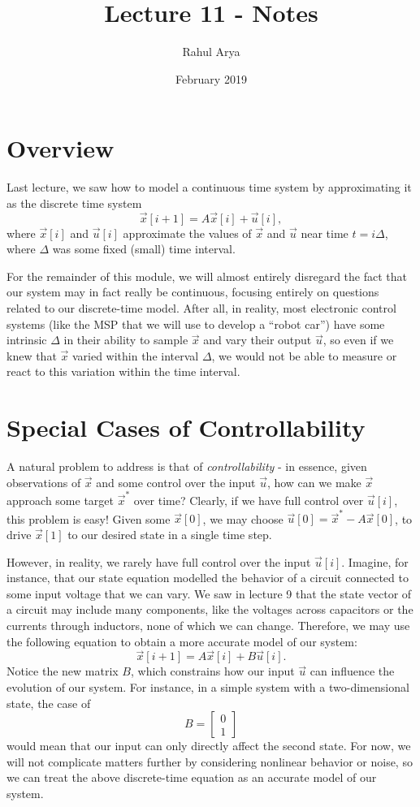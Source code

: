\documentclass[letterpaper]{article}
\title{Lecture 11 - Notes}
\author{Rahul Arya}
\date{February 2019}
\theoremstyle{remark}
\newcommand{\mat}[1]{\ensuremath{\begin{bmatrix}#1\end{bmatrix}}}
\begin{document}
\maketitle

\section{Overview}
Last lecture, we saw how to model a continuous time system by approximating it as the discrete time system
\[
    \vec{x}[i + 1] = A\vec{x}[i] + \vec{u}[i],
\]
where $\vec{x}[i]$ and $\vec{u}[i]$ approximate the values of $\vec{x}$ and $\vec{u}$ near time $t = i\Delta$, where $\Delta$ was some fixed (small) time interval.

For the remainder of this module, we will almost entirely disregard the fact that our system may in fact really be continuous, focusing entirely on questions related to our discrete-time model. After all, in reality, most electronic control systems (like the MSP that we will use to develop a ``robot car'') have some intrinsic $\Delta$ in their ability to sample $\vec{x}$ and vary their output $\vec{u}$, so even if we knew that $\vec{x}$ varied within the interval $\Delta$, we would not be able to measure or react to this variation within the time interval.

\section{Special Cases of Controllability}
A natural problem to address is that of \emph{controllability} - in essence, given observations of $\vec{x}$ and some control over the input $\vec{u}$, how can we make $\vec{x}$ approach some target $\vec{x}^*$ over time? Clearly, if we have full control over $\vec{u}[i]$, this problem is easy! Given some $\vec{x}[0]$, we may choose $\vec{u}[0] = \vec{x}^* - A\vec{x}[0]$, to drive $\vec{x}[1]$ to our desired state in a single time step.

However, in reality, we rarely have full control over the input $\vec{u}[i]$. Imagine, for instance, that our state equation modelled the behavior of a circuit connected to some input voltage that we can vary. We saw in lecture 9 that the state vector of a circuit may include many components, like the voltages across capacitors or the currents through inductors, none of which we can change. Therefore, we may use the following equation to obtain a more accurate model of our system:
\[
    \vec{x}[i + 1] = A\vec{x}[i] + B\vec{u}[i].
\]
Notice the new matrix $B$, which constrains how our input $\vec{u}$ can influence the evolution of our system. For instance, in a simple system with a two-dimensional state, the case of
\[
    B = \mat{0 \\ 1}
\]
would mean that our input can only directly affect the second state. For now, we will not complicate matters further by considering nonlinear behavior or noise, so we can treat the above discrete-time equation as an accurate model of our system.
\end{document}
